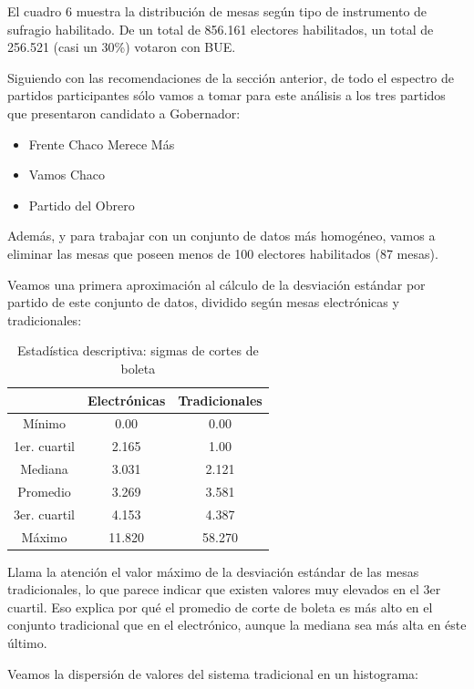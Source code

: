 \documentclass[12pt,a4paper]{article}
\begin{document}
El cuadro 6 muestra la distribución de mesas según tipo de instrumento de
sufragio habilitado. De un total de 856.161 electores habilitados, un total de
256.521 (casi un 30\%) votaron con BUE.

Siguiendo con las recomendaciones de la sección anterior, de todo el espectro de
partidos participantes sólo vamos a tomar para este análisis a los tres partidos
que presentaron candidato a Gobernador:

\begin{itemize}
  \item Frente Chaco Merece Más
  \item Vamos Chaco
  \item Partido del Obrero
\end{itemize}

Además, y para trabajar con un conjunto de datos más homogéneo, vamos a eliminar
las mesas que poseen menos de 100 electores habilitados (87 mesas).

Veamos una primera aproximación al cálculo de la desviación estándar por partido
de este conjunto de datos, dividido según mesas electrónicas y tradicionales:

\begin{table}[h!]
\centering
\label{my-label}
\begin{tabular}{c c c}
 & Electrónicas & Tradicionales \\
\hline
Mínimo & 0.00 & 0.00 \\
1er. cuartil & 2.165 & 1.00 \\
Mediana & 3.031 & 2.121 \\
Promedio & 3.269 & 3.581 \\
3er. cuartil & 4.153 & 4.387 \\
Máximo & 11.820 & 58.270 \\
\hline
\end{tabular}
\caption{Estadística descriptiva: sigmas de cortes de boleta}
\label{table:1}
\end{table}

Llama la atención el valor máximo de la desviación estándar de las mesas
tradicionales, lo que parece indicar que existen valores muy elevados en el 3er
cuartil. Eso explica por qué el promedio de corte de boleta es más alto en el
conjunto tradicional que en el electrónico, aunque la mediana sea más alta en
éste último.

Veamos la dispersión de valores del sistema tradicional en un histograma:
\end{document}
